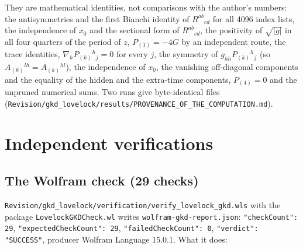 \documentclass[11pt]{article}
\begin{document}
They are mathematical identities, not comparisons with the author's numbers: the antisymmetries and the first Bianchi identity of $R^{ab}{}_{cd}$ for all 4096 index lists, the independence of $x_0$ and the sectional form of $R^{ab}{}_{cd}$, the positivity of $\sqrt{|g|}$ in all four quarters of the period of $z$, $P_{(1)} = -4G$ by an independent route, the trace identities, $\nabla_hP_{(k)}{}^h{}_j = 0$ for every $j$, the symmetry of $g_{hh}P_{(k)}{}^h{}_j$ (so $A_{(k)}{}^{lh} = A_{(k)}{}^{hl}$), the independence of $x_0$, the vanishing off-diagonal components and the equality of the hidden and the extra-time components, $P_{(4)} = 0$ and the unpruned numerical sums. Two runs give byte-identical files (\texttt{Revision\allowbreak{}/gkd\_lov\allowbreak{}elock/re\allowbreak{}sults/PR\allowbreak{}OVENANCE\allowbreak{}\_OF\_THE\_\allowbreak{}COMPUTAT\allowbreak{}ION.md}).

\section{Independent verifications}

\subsection{The Wolfram check (29 checks)}

\texttt{Revision\allowbreak{}/gkd\_lov\allowbreak{}elock/ve\allowbreak{}rificati\allowbreak{}on/verif\allowbreak{}y\_lovelo\allowbreak{}ck\_gkd.w\allowbreak{}ls} with the package \texttt{Lovelock\allowbreak{}GKDCheck\allowbreak{}.wl} writes \texttt{wolfram-\allowbreak{}gkd-repo\allowbreak{}rt.json}: \texttt{"checkCo\allowbreak{}unt": 29}, \texttt{"expecte\allowbreak{}dCheckCo\allowbreak{}unt": 29}, \texttt{"failedC\allowbreak{}heckCoun\allowbreak{}t": 0}, \texttt{"verdict\allowbreak{}": "SUCC\allowbreak{}ESS"}, producer Wolfram Language 15.0.1. What it does:
\end{document}
